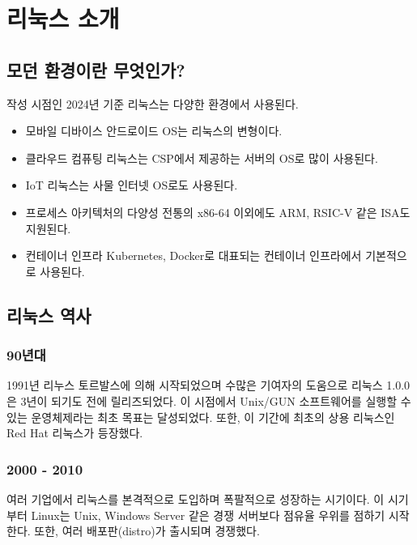 \chapter{리눅스 소개}

\section{모던 환경이란 무엇인가?}
작성 시점인 2024년 기준 리눅스는 다양한 환경에서 사용된다.

\begin{itemize}
    \item 모바일 디바이스 \newline 
        안드로이드 OS는 리눅스의 변형이다.
    \item 클라우드 컴퓨팅 \newline  
        리눅스는 CSP에서 제공하는 서버의 OS로 많이 사용된다.
    \item IoT \newline
        리눅스는 사물 인터넷 OS로도 사용된다.
    \item 프로세스 아키텍처의 다양성 \newline 
        전통의 x86-64 이외에도 ARM, RSIC-V 같은 ISA도 지원된다.
    \item 컨테이너 인프라 \newline
        Kubernetes, Docker로 대표되는 컨테이너 인프라에서 기본적으로 사용된다.
\end{itemize}
\newpage


\section{리눅스 역사}
\subsection*{90년대}
1991년 리누스 토르발스에 의해 시작되었으며 수많은 기여자의 도움으로 리눅스 1.0.0은 3년이 되기도 전에 릴리즈되었다.
\newline
이 시점에서 Unix/GUN 소프트웨어를 실행할 수 있는 운영체제라는 최초 목표는 달성되었다.
또한, 이 기간에 최초의 상용 리눅스인 Red Hat 리눅스가 등장했다.

\subsection*{2000 - 2010}
여러 기업에서 리눅스를 본격적으로 도입하며 폭팔적으로 성장하는 시기이다.\newline
이 시기부터 Linux는 Unix, Windows Server 같은 경쟁 서버보다 점유율 우위를 점하기 시작한다.
또한, 여러 배포판(distro)가 출시되며 경쟁했다.

